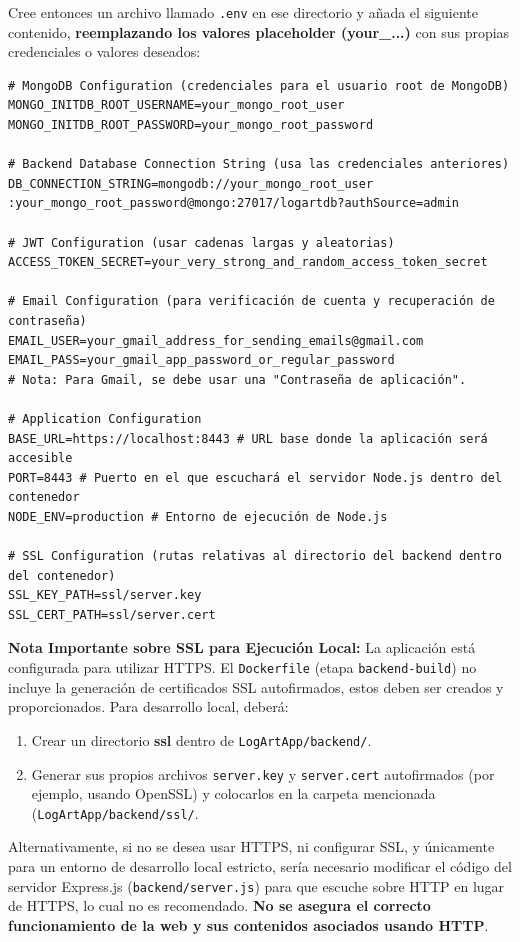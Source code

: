Cree entonces un archivo llamado \texttt{.env} en ese directorio y añada el siguiente contenido, \textbf{reemplazando los valores placeholder (your\_...)} con sus propias credenciales o valores deseados:

\begin{verbatim}
# MongoDB Configuration (credenciales para el usuario root de MongoDB)
MONGO_INITDB_ROOT_USERNAME=your_mongo_root_user
MONGO_INITDB_ROOT_PASSWORD=your_mongo_root_password

# Backend Database Connection String (usa las credenciales anteriores)
DB_CONNECTION_STRING=mongodb://your_mongo_root_user
:your_mongo_root_password@mongo:27017/logartdb?authSource=admin

# JWT Configuration (usar cadenas largas y aleatorias)
ACCESS_TOKEN_SECRET=your_very_strong_and_random_access_token_secret

# Email Configuration (para verificación de cuenta y recuperación de contraseña)
EMAIL_USER=your_gmail_address_for_sending_emails@gmail.com
EMAIL_PASS=your_gmail_app_password_or_regular_password 
# Nota: Para Gmail, se debe usar una "Contraseña de aplicación".

# Application Configuration
BASE_URL=https://localhost:8443 # URL base donde la aplicación será accesible
PORT=8443 # Puerto en el que escuchará el servidor Node.js dentro del contenedor
NODE_ENV=production # Entorno de ejecución de Node.js

# SSL Configuration (rutas relativas al directorio del backend dentro del contenedor)
SSL_KEY_PATH=ssl/server.key
SSL_CERT_PATH=ssl/server.cert
\end{verbatim}

\textbf{Nota Importante sobre SSL para Ejecución Local:}
La aplicación está configurada para utilizar HTTPS. El \texttt{Dockerfile} (etapa \texttt{backend-build}) no incluye la generación de certificados SSL autofirmados, estos deben ser creados y proporcionados. Para desarrollo local, deberá:
\begin{enumerate}
    \item Crear un directorio \textbf{ssl} dentro de \texttt{LogArtApp/backend/}.
    \item Generar sus propios archivos \texttt{server.key} y \texttt{server.cert} autofirmados (por ejemplo, usando OpenSSL) y colocarlos en la carpeta mencionada (\texttt{LogArtApp/backend/ssl/}.
\end{enumerate}
Alternativamente, si no se desea usar HTTPS, ni configurar SSL, y únicamente para un entorno de desarrollo local estricto, sería necesario modificar el código del servidor Express.js (\texttt{backend/server.js}) para que escuche sobre HTTP en lugar de HTTPS, lo cual no es recomendado. \textbf{No se asegura el correcto funcionamiento de la web y sus contenidos asociados usando HTTP}.

